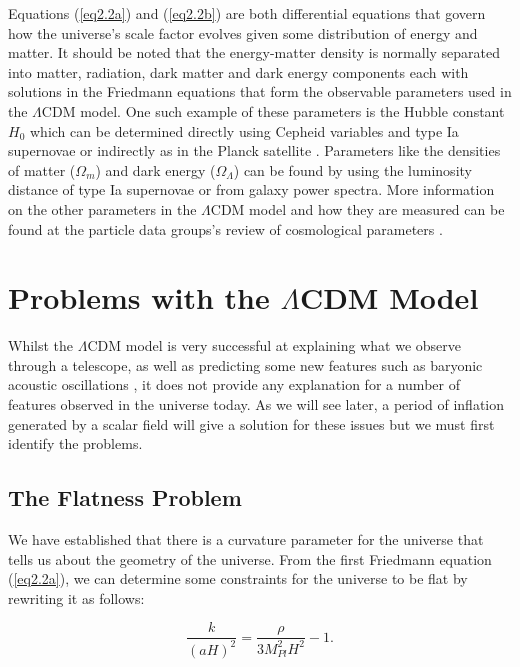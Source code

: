 \documentclass[a4paper,12pt,twoside]{report}
\begin{document}
 Equations (\ref{eq2.2a}) and (\ref{eq2.2b}) are both differential equations that govern how the universe's scale factor evolves given some distribution of energy and matter. It should be noted that the energy-matter density is normally separated into matter, radiation, dark matter and dark energy components each with solutions in the Friedmann equations that form the observable parameters used in the $\Lambda$CDM model. One such example of these parameters is the Hubble constant $H_{0}$ which can be determined directly using Cepheid variables and type Ia supernovae \cite{Freedman} or indirectly as in the Planck satellite \cite{Planck}. Parameters like the densities of matter ($\Omega_{m}$) and dark energy ($\Omega_{\Lambda}$) can be found by using the luminosity distance of type Ia supernovae or from galaxy power spectra. More information on the other parameters in the $\Lambda$CDM model and how they are measured can be found at the particle data groups's review of cosmological parameters \cite{Lahav}.

\section{Problems with the $\Lambda$CDM Model}\label{sec:ProbLCDMmodel}

Whilst the $\Lambda$CDM model is very successful at explaining what we observe through a telescope, as well as predicting some new features such as baryonic acoustic oscillations \cite{Eisenstein:2005su}, it does not provide any explanation for a number of features observed in the universe today. As we will see later, a period of inflation generated by a scalar field will give a solution for these issues but we must first identify the problems.

\subsection{The Flatness Problem}\label{subsec:FlatProb}

We have established that there is a curvature parameter for the universe that tells us about the geometry of the universe. From the first Friedmann equation (\ref{eq2.2a}), we can determine some constraints for the universe to be flat by rewriting it as follows:

\begin{equation}
\frac{k}{(aH)^{2}} = \frac{\rho}{3M_{Pl}^{2}H^{2}} - 1. \label{eq2.4}
\end{equation}
\end{document}
